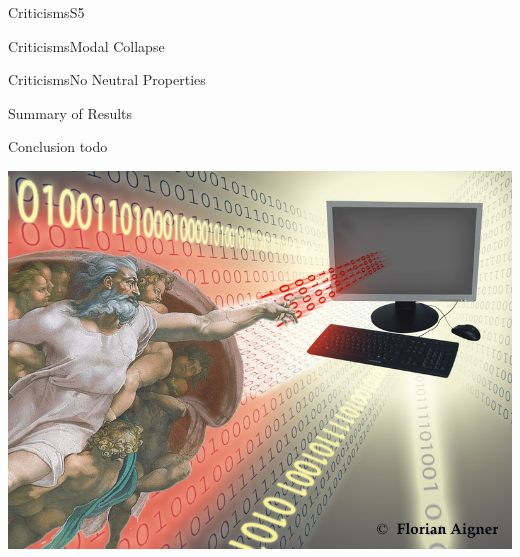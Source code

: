 
\begin{frame}{Criticisms}{S5}

\end{frame}


\begin{frame}{Criticisms}{Modal Collapse}

\end{frame}


\begin{frame}{Criticisms}{No Neutral Properties}

\end{frame}




\begin{frame}{Summary of Results}


\end{frame}


\begin{frame}{Conclusion} \small
todo
\end{frame}

\begin{frame}
\includegraphics[width=\textwidth]{TUWien-GodComputerC} 
\end{frame}

